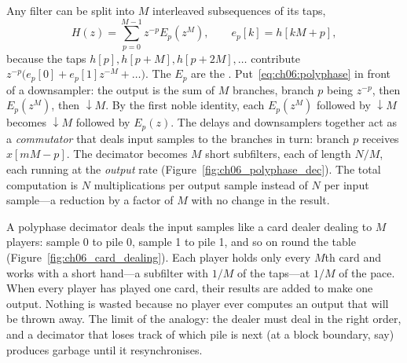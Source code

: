 Any filter can be split into $M$ interleaved subsequences of its taps,
\begin{equation}
H(z)=\sum_{p=0}^{M-1}z^{-p}E_p(z^M),\qquad e_p[k]=h[kM+p],
\label{eq:ch06:polyphase}
\end{equation}
because the taps $h[p],h[p+M],h[p+2M],\dots$ contribute $z^{-p}\bigl(e_p[0]+e_p[1]z^{-M}+\dots\bigr)$.
The $E_p$ are the . Put~\eqref{eq:ch06:polyphase} in front of a
downsampler: the output is the sum of $M$ branches, branch $p$ being $z^{-p}$, then $E_p(z^M)$,
then $\downarrow M$. By the first noble identity, each $E_p(z^M)$ followed by $\downarrow M$ becomes
$\downarrow M$ followed by $E_p(z)$. The delays and downsamplers together act as a
\emph{commutator} that deals input samples to the branches in turn: branch $p$ receives
$x[mM-p]$. The decimator becomes $M$ short subfilters, each of length $N/M$, each running at the
\emph{output} rate (Figure~\ref{fig:ch06_polyphase_dec}). The total computation is $N$
multiplications per output sample instead of $N$ per input sample---a reduction by a factor of $M$
with no change in the result.

\begin{analogy}
A polyphase decimator deals the input samples like a card dealer dealing to $M$ players: sample 0
to pile 0, sample 1 to pile 1, and so on round the table (Figure~\ref{fig:ch06_card_dealing}). Each
player holds only every $M$th card and works with a short hand---a subfilter with $1/M$ of the
taps---at $1/M$ of the pace. When every player has played one card, their results are added to
make one output. Nothing is wasted because no player ever computes an output that will be thrown
away. The limit of the analogy: the dealer must deal in the right order, and a decimator that
loses track of which pile is next (at a block boundary, say) produces garbage until it resynchronises.
\end{analogy}


